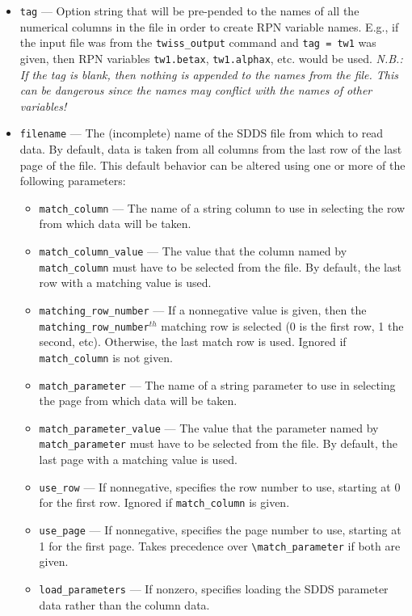 \documentclass[11pt]{article}
\begin{document}
\begin{itemize}

\item \verb|tag| --- Option string that will be pre-pended to the names of all the numerical columns 
 in the file in order to create RPN variable names.  E.g., if the input file was from the
 \verb|twiss_output| command and \verb|tag = tw1| was given, then RPN variables 
 \verb|tw1.betax|, \verb|tw1.alphax|, etc. would be used.  {\em N.B.: If the tag is blank, then nothing 
 is appended to the names from the file.  This can be dangerous since the names may conflict with
 the names of other variables!}

\item \verb|filename| --- The (incomplete) name of the SDDS file from which to read data.
    By default, data is taken from all columns from the last row of the last page of the file.
    This default behavior can be altered using one or more of the following parameters:
\begin{itemize}
    
\item \verb|match_column| --- The name of a string column to use in selecting the row from
 which data will be taken.

\item  \verb|match_column_value| --- The value that the column named by \verb|match_column| must
 have to be selected from the file.  By default, the last row with a matching value is used.

\item \verb|matching_row_number| --- If a nonnegative value is given, then the \verb|matching_row_number|$^{th}$
 matching row is selected (0 is the first row, 1 the second, etc).  Otherwise, the last match row is used.  Ignored if \verb|match_column| is not
 given.

\item \verb|match_parameter| --- The name of a string parameter to use in selecting the page
 from which data will be taken.  

\item \verb|match_parameter_value| --- The value that the parameter named by \verb|match_parameter| must
 have to be selected from the file.  By default, the last page with a matching value is used.

\item \verb|use_row| --- If nonnegative, specifies the row number to use, starting at 0 for the first row.
 Ignored if \verb|match_column| is given.

\item \verb|use_page| --- If nonnegative, specifies the page number to use, starting at 1 for the first page.
 Takes precedence over \verb|\match_parameter| if both are given.

\item \verb|load_parameters| --- If nonzero, specifies loading the SDDS parameter data rather than the column data.
\end{itemize}
\end{itemize}
\end{document}
